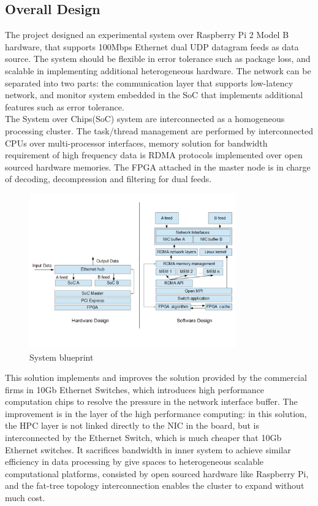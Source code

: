 \documentclass[11pt,openright,a4paper]{report}
\begin{document}
\subsection{Overall Design}
The project designed an experimental system over Raspberry Pi 2 Model B hardware, that supports 100Mbps Ethernet dual UDP datagram feeds as data source. The system should be flexible in error tolerance such as package loss, and scalable in implementing additional heterogeneous hardware. The network can be separated into two parts: the communication layer that supports low-latency network, and monitor system embedded in the SoC that implements additional features such as error tolerance. \\ 
The System over Chips(SoC) system are interconnected as a homogeneous processing cluster. The task/thread management are performed by interconnected CPUs over multi-processor interfaces, memory solution for bandwidth requirement of high frequency data is RDMA protocols implemented over open sourced hardware memories. The FPGA attached in the master node is in charge of decoding, decompression and filtering for dual feeds.\\
\begin{figure}[H]
	\centering\includegraphics[width=3.5in]{picture/System_Design.jpg}
	\caption{System blueprint}
	\label{fig:system_design}
\end{figure}
This solution implements and improves the solution provided by the commercial firms in 10Gb Ethernet Switches, which introduces high performance computation chips to resolve the pressure in the network interface buffer. The improvement is in the layer of the high performance computing: in this solution, the HPC layer is not linked directly to the NIC in the board, but is interconnected by the Ethernet Switch, which is much cheaper that 10Gb Ethernet switches. It sacrifices bandwidth in inner system to achieve similar efficiency in data processing by give spaces to heterogeneous scalable computational platforms, consisted by open sourced hardware like Raspberry Pi, and the fat-tree topology interconnection enables the cluster to expand without much cost.\\
\end{document}
